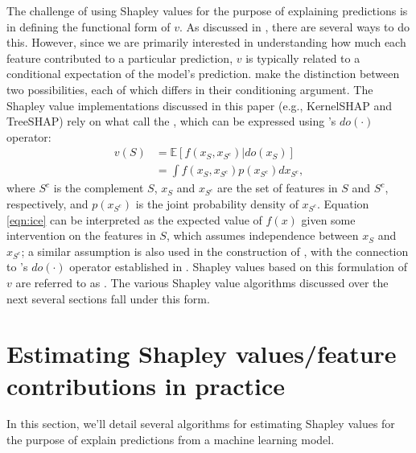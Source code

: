 The challenge of using Shapley values for the purpose of explaining
predictions is in defining the functional form of \(v\). As discussed in
\citet{chen-2020-true}, there are several ways to do this. However,
since we are primarily interested in understanding how much each feature
contributed to a particular prediction, \(v\) is typically related to a
conditional expectation of the model's prediction.
\citet{chen-2020-true} make the distinction between two possibilities,
each of which differs in their conditioning argument. The Shapley value
implementations discussed in this paper (e.g., KernelSHAP and TreeSHAP)
rely on what \citet{chen-2020-true} call the
, which can be expressed
using \citeauthor{pearl-2009-causality}'s
\citeyearpar{pearl-2009-causality} \(do\left(\cdot\right)\) operator:
\begin{equation}
\label{eqn:ice}
\begin{split}
  v\left(S\right) &= \mathbb{E}\left[f\left(x_S, x_{S^c}\right) | do\left(x_S\right)\right] \\
                  &= \int f\left(x_S, x_{S^c}\right) p\left(x_{S^c}\right) d x_{S^c},
\end{split}
\end{equation} where \(S^c\) is the complement \(S\), \(x_S\) and
\(x_{S^c}\) are the set of features in \(S\) and \(S^c\), respectively,
and \(p\left(x_{S^c}\right)\) is the joint probability density of
\(x_{S^c}\). Equation \eqref{eqn:ice} can be interpreted as the expected
value of \(f\left(x\right)\) given some intervention on the features in
\(S\), which assumes independence between \(x_S\) and \(x_{S^c}\); a
similar assumption is also used in the construction of
 \citep{friedman-2001-greedy}, with the
connection to \citeauthor{pearl-2009-causality}'s
\citeyearpar{pearl-2009-causality} \(do\left(\cdot\right)\) operator
established in \citet{zhao-2021-causal}. Shapley values based on this
formulation of \(v\) are referred to as
 \citep{chen-2020-true}. The various
Shapley value algorithms discussed over the next several sections fall
under this form.

\section{Estimating Shapley values/feature contributions in practice}

In this section, we'll detail several algorithms for estimating Shapley
values for the purpose of explain predictions from a machine learning
model.

